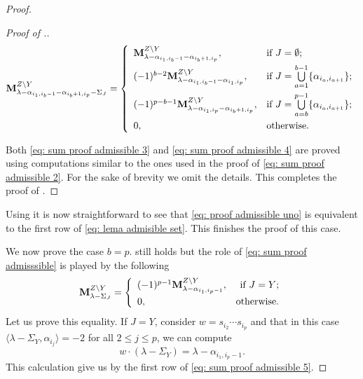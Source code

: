 \begin{proof}
\begin{proof}[Proof of .]
 \begin{equation}\label{eq: sum proof admissible 4}
        \mathbf{M}_{\lambda - \alpha_{i_{1},i_{b}-1} - \alpha_{i_{b}+1,i_{p}} - {\Sigma_{J}}}^{Z\setminus Y} = \left\{\begin{array}{ll}
            \mathbf{M}_{\lambda - \alpha_{i_{1},i_{b}-1} - \alpha_{i_{b}+1,i_{p}}}^{Z\setminus Y}, & \text{if } J=\emptyset ;\\[5pt]
            (-1)^{b-2}\mathbf{M}_{\lambda - \alpha_{i_{1},i_{b}-1} - \alpha_{i_{1},i_{p}}}^{Z\setminus Y}, & \text{if } J=\bigcup\limits_{a=1}^{b-1}\{\alpha_{i_{a},i_{a+1}}\}; \\[10pt]
            (-1)^{p-b-1}\mathbf{M}_{\lambda - \alpha_{i_{1},i_{p}} - \alpha_{i_{b}+1,i_{p}}}^{Z\setminus Y}, & \text{if } J=\bigcup\limits_{a=b}^{p-1}\{\alpha_{i_{a},i_{a+1}}\}; \\[10pt]
            0, &\text{otherwise.}
        \end{array}\right. 
    \end{equation}

Both \eqref{eq: sum proof admissible 3} and \eqref{eq: sum proof admissible 4} are proved using computations similar to the ones used in the proof of \eqref{eq: sum proof admissible 2}. For the sake of brevity we omit the details. This completes the proof of . 
\end{proof}


Using  it is now straightforward to see that \eqref{eq: proof admissible uno} is equivalent to the first row of \eqref{eq: lema admisible set}. 
This finishes the proof of this case. 


\medskip
We now prove the case $b=p$.     still holds but the role of \eqref{eq: sum proof admisssible} is played by the following
\begin{equation}\label{eq: sum proof admissible 5}
    \mathbf{M}_{\lambda-\Sigma_{J}}^{Z\setminus Y}=\left\{\begin{array}{lr}
        (-1)^{p-1}\mathbf{M}_{\lambda - \alpha_{i_{1},i_{p}-1}}^{Z\setminus Y}, &\text{if } J=Y;\\[5pt]
        0, & \text{otherwise.}
    \end{array}\right.
\end{equation}
Let us prove this equality.  If $J=Y$, consider $w=s_{i_{2}}\cdots s_{i_{p}}$ and that in this case $\langle \lambda -\Sigma_{Y},\alpha_{i_j}\rangle=-2$ for all $2\leq j \leq p$, we can compute
\begin{equation}
    w\cdot (\lambda-\Sigma_{Y}) = \lambda - \alpha_{i_{1},i_{p}-1}.
\end{equation}
This calculation give us by  the first row of \eqref{eq: sum proof admissible 5}.


\end{proof}
